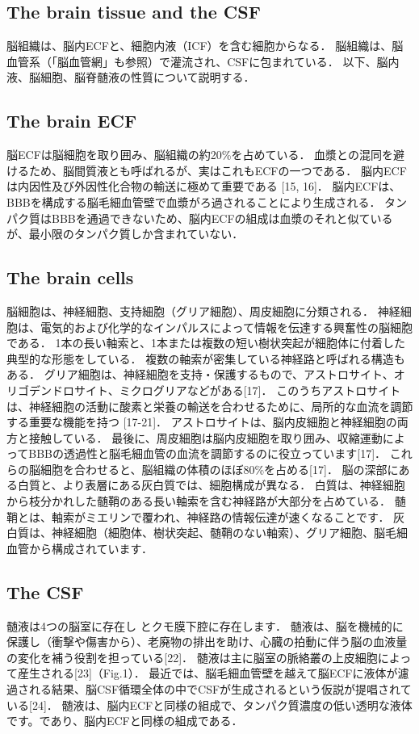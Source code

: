 \documentclass[11pt,a4paper]{jsarticle}
\begin{document}
\subsection{The brain tissue and the CSF}
脳組織は、脳内ECFと、細胞内液（ICF）を含む細胞からなる．
脳組織は、脳血管系（「脳血管網」も参照）で灌流され、CSFに包まれている．
以下、脳内液、脳細胞、脳脊髄液の性質について説明する．
\subsection{The brain ECF}
脳ECFは脳細胞を取り囲み、脳組織の約20\%を占めている．
血漿との混同を避けるため、脳間質液とも呼ばれるが、実はこれもECFの一つである．
脳内ECFは内因性及び外因性化合物の輸送に極めて重要である [15, 16]．
脳内ECFは、BBBを構成する脳毛細血管壁で血漿がろ過されることにより生成される．
タンパク質はBBBを通過できないため、脳内ECFの組成は血漿のそれと似ているが、最小限のタンパク質しか含まれていない．
\subsection{The brain cells}
脳細胞は、神経細胞、支持細胞（グリア細胞）、周皮細胞に分類される．
神経細胞は、電気的および化学的なインパルスによって情報を伝達する興奮性の脳細胞である．
1本の長い軸索と、1本または複数の短い樹状突起が細胞体に付着した典型的な形態をしている．
複数の軸索が密集している神経路と呼ばれる構造もある．
グリア細胞は、神経細胞を支持・保護するもので、アストロサイト、オリゴデンドロサイト、ミクログリアなどがある[17]．
このうちアストロサイトは、神経細胞の活動に酸素と栄養の輸送を合わせるために、局所的な血流を調節する重要な機能を持つ [17-21]．
アストロサイトは、脳内皮細胞と神経細胞の両方と接触している．
最後に、周皮細胞は脳内皮細胞を取り囲み、収縮運動によってBBBの透過性と脳毛細血管の血流を調節するのに役立っています[17]．
これらの脳細胞を合わせると、脳組織の体積のほぼ80\%を占める[17]．
脳の深部にある白質と、より表層にある灰白質では、細胞構成が異なる．
白質は、神経細胞から枝分かれした髄鞘のある長い軸索を含む神経路が大部分を占めている．
髄鞘とは、軸索がミエリンで覆われ、神経路の情報伝達が速くなることです．
灰白質は、神経細胞（細胞体、樹状突起、髄鞘のない軸索）、グリア細胞、脳毛細血管から構成されています．
\subsection{The CSF}
髄液は4つの脳室に存在し とクモ膜下腔に存在します．
髄液は、脳を機械的に保護し（衝撃や傷害から）、老廃物の排出を助け、心臓の拍動に伴う脳の血液量の変化を補う役割を担っている[22]．
髄液は主に脳室の脈絡叢の上皮細胞によって産生される[23]（Fig.1）．
最近では、脳毛細血管壁を越えて脳ECFに液体が濾過される結果、脳CSF循環全体の中でCSFが生成されるという仮説が提唱されている[24]．
髄液は、脳内ECFと同様の組成で、タンパク質濃度の低い透明な液体です。であり、脳内ECFと同様の組成である．
\end{document}
